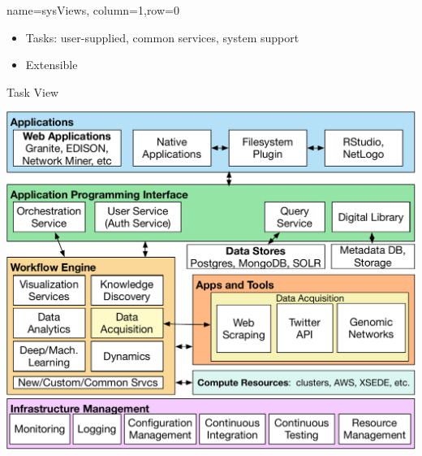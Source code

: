 \documentclass[landscape,paperwidth=70in,paperheight=46in,fontscale=0.225]{baposter} %
\begin{document}
\begin{poster}
{}


          {name=sysViews, column=1,row=0}{
          
\begin{minipage}{.45\textwidth}
\begin{itemize}[leftmargin=*,noitemsep,topsep=0pt]
\item Tasks:  user-supplied, common services, system support
\item Extensible
\end{itemize}
\end{minipage}
\hfill
\begin{minipage}{.55\textwidth}

\begin{center}
Task View
\end{center}

\includegraphics[scale=0.2]{figures/CINSArchV8.pdf} 
\end{minipage}

}
\end{poster}
\end{document}
